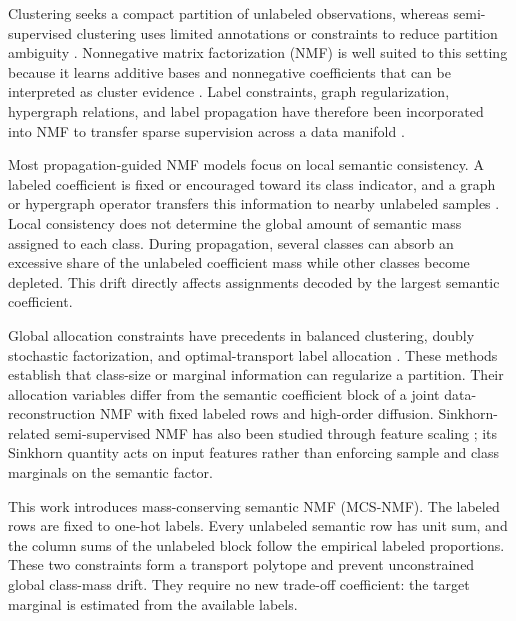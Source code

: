 \documentclass[times, review, 10pt]{elsarticle}
\begin{document}
Clustering seeks a compact partition of unlabeled observations, whereas semi-supervised clustering uses limited annotations or constraints to reduce partition ambiguity \cite{Jain1999Clustering,Jain2010Clustering,Bair2013SSC,VanEngelen2020Survey}. Nonnegative matrix factorization (NMF) is well suited to this setting because it learns additive bases and nonnegative coefficients that can be interpreted as cluster evidence \cite{Lee1999NMF,Lee2001Algorithms,Gillis2014WhyHow}. Label constraints, graph regularization, hypergraph relations, and label propagation have therefore been incorporated into NMF to transfer sparse supervision across a data manifold \cite{Liu2012CNMF,Cai2011GNMF,Zeng2014HypergraphNMF,Yi2015LpSNMF,Lan2022LPNMF,Wang2015ConstraintNMF}.

Most propagation-guided NMF models focus on local semantic consistency. A labeled coefficient is fixed or encouraged toward its class indicator, and a graph or hypergraph operator transfers this information to nearby unlabeled samples \cite{Wang2022PNLP,Yin2023HSSNMF,Mo2024PNLPSCNMF,Li2025GOCNMF,Li2025OCSNMF,Yang2025SPNMF,Li2026HLPNMF}. Local consistency does not determine the global amount of semantic mass assigned to each class. During propagation, several classes can absorb an excessive share of the unlabeled coefficient mass while other classes become depleted. This drift directly affects assignments decoded by the largest semantic coefficient.

Global allocation constraints have precedents in balanced clustering, doubly stochastic factorization, and optimal-transport label allocation \cite{Yang2016Doubly,Tai2021Sinkhorn,Wang2026BSNMF}. These methods establish that class-size or marginal information can regularize a partition. Their allocation variables differ from the semantic coefficient block of a joint data-reconstruction NMF with fixed labeled rows and high-order diffusion. Sinkhorn-related semi-supervised NMF has also been studied through feature scaling \cite{Li2022SinkhornNMF}; its Sinkhorn quantity acts on input features rather than enforcing sample and class marginals on the semantic factor.

This work introduces mass-conserving semantic NMF (MCS-NMF). The labeled rows are fixed to one-hot labels. Every unlabeled semantic row has unit sum, and the column sums of the unlabeled block follow the empirical labeled proportions. These two constraints form a transport polytope and prevent unconstrained global class-mass drift. They require no new trade-off coefficient: the target marginal is estimated from the available labels.
\end{document}
